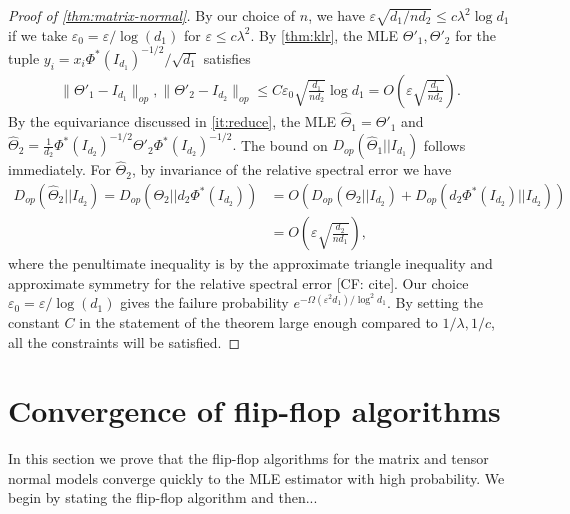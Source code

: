 \documentclass[aos]{imsart}
\theoremstyle{definition}
\numberwithin{equation}{section}
\newcommand{\htheta}{\widehat{\Theta}}
\newcommand{\eps}{\varepsilon}
\newcommand{\CF}[1]{{\color{purple}[CF: #1]}}
\begin{document}
\begin{proof}[Proof of \cref{thm:matrix-normal}]
By our choice of $n$, we have $\eps \sqrt{d_1/nd_2} \leq c\lambda^2\log d_1$ if we take $\eps_0 = \eps/\log(d_1)$ for $\eps \leq c\lambda^2$. By \cref{thm:klr}, the MLE $\Theta'_1, \Theta'_2$ for the tuple $y_i =  x_i \Phi^*(I_{d_1})^{-1/2}/\sqrt{d_1}$ satisfies 
\begin{gather*} \| \Theta'_1 - I_{d_1}\|_{op}, \| \Theta'_2 - I_{d_2}\|_{op} \leq C \eps_0 \sqrt{\frac{d_1}{n d_2}} \log d_1 = O\left(\eps \sqrt{\frac{d_1}{n d_2}}\right).\end{gather*}
By the equivariance discussed in \cref{it:reduce}, the MLE $\htheta_1 = \Theta'_1$ and $\htheta_2 = \frac{1}{d_2}\Phi^*(I_{d_2})^{-1/2}\Theta'_2\Phi^*(I_{d_2})^{-1/2}.$ The bound on $D_{op}(\htheta_1||I_{d_1})$ follows immediately. For $\htheta_2$, by invariance of the relative spectral error we have 
\begin{align*}D_{op}(\htheta_2|| I_{d_2}) = D_{op} (\Theta_2 || d_2\Phi^*(I_{d_2})) &= O( D_{op}(\Theta_2 || I_{d_2}) + D_{op}(d_2\Phi^*(I_{d_2})|| I_{d_2}))\\
& = O\left(\eps \sqrt{\frac{d_2}{n d_1}}\right),
\end{align*} where the penultimate inequality is by the approximate triangle inequality and approximate symmetry for the relative spectral error \CF{cite}. Our choice $\eps_0 = \eps/\log(d_1)$ gives the failure probability $e^{- \Omega(\eps^2 d_1)/\log^2 d_1}$. By setting the constant $C$ in the statement of the theorem large enough compared to $1/\lambda, 1/c$, all the constraints will be satisfied.
\end{proof}









\section{Convergence of flip-flop algorithms}
In this section we prove that the flip-flop algorithms for the matrix and tensor normal models converge quickly to the MLE estimator with high probability. We begin by stating the flip-flop algorithm and then...
\end{document}

